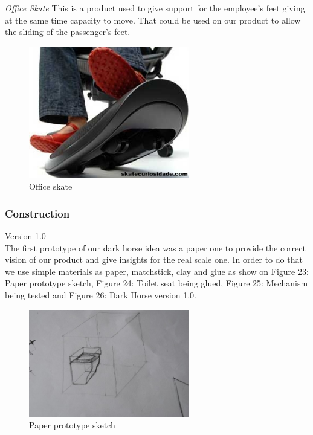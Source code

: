 \emph{Office Skate} This is a product used to give support for the employee’s feet giving at the same time capacity to move. That could be used on our product to allow the sliding of the passenger’s feet.

\begin{figure}[h]
\centering
\includegraphics[width=7cm]{brazil_images/image024.jpg}
\caption{Office skate} %
\label{fig:office_skate}
\end{figure}

\subsubsection{Construction}
Version 1.0 \\

The first prototype of our dark horse idea was a paper one to provide the correct vision of our product and give insights for the real scale one. In order to do that we use simple materials as paper, matchstick, clay and glue as show on Figure 23: Paper prototype sketch, Figure 24: Toilet seat being glued, Figure 25: Mechanism being tested and Figure 26: Dark Horse version 1.0.

\begin{figure}[h]
\centering
\includegraphics[width=7cm]{brazil_images/image025.jpg}
\caption{Paper prototype sketch}
\label{fig:paper_prototype}
\end{figure}


